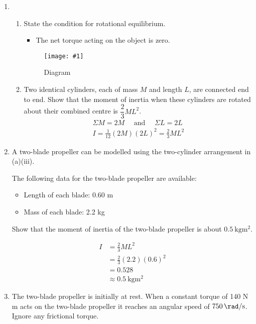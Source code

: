 \documentclass[a4paper,12pt]{article}
\newcommand{\img}[4]{\begin{center}
  \begin{figure}[H]
    \centering
    \texttt{[image: \#1]}
    \caption{#3}
    \label{fig:#4}
  \end{figure}
\end{center}}
\begin{document}
\begin{enumerate}[label=(\alph*)]
  \item \begin{enumerate}[label=(\roman*)]
          \item State the condition for rotational equilibrium.
                \begin{itemize}
                  \item The net torque acting on the object is zero.
                \end{itemize}
                \img{ex/4.png}{0.5}{Diagram}{cylinder2}
          \item Two identical cylinders, each of mass $M$ and length $L$, are connected end to end. Show that the moment of inertia when these cylinders are rotated about their combined centre is $\dfrac{2}{3}ML^2$.
                \begin{align*}
                  \Sigma M = 2M \quad \text{ and } \quad \Sigma L = 2L \\
                  I = \frac{1}{12}(2M)(2L)^2 = \frac{2}{3}ML^2
                \end{align*}
        \end{enumerate}
  \item A two-blade propeller can be modelled using the two-cylinder arrangement in (a)(iii).

        The following data for the two-blade propeller are available:
        \begin{itemize}
          \item Length of each blade: 0.60 m
          \item Mass of each blade: 2.2 kg
        \end{itemize}

        Show that the moment of inertia of the two-blade propeller is about $\SI{0.5}{\kg\m\squared}$.

        \begin{align*}
          I & = \frac{2}{3}ML^2               \\
            & = \frac{2}{3}(2.2)(0.6)^2       \\
            & = 0.528                         \\
            & \approx \SI{0.5}{\kg\m\squared}
        \end{align*}
  \item The two-blade propeller is initially at rest. When a constant torque of 140 N m acts on the two-blade propeller it reaches an angular speed of $\SI{750}{\rad\per\s}$. Ignore any frictional torque.


\end{enumerate}
\end{document}
